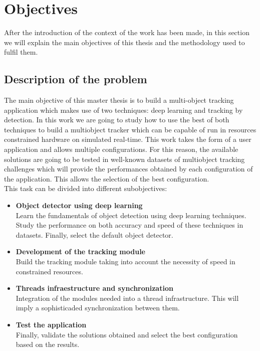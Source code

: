 \section{Objectives}
After the introduction of the context of the work has been made, in this section we will explain the main objectives of this thesis and the methodology used to fulfil them.

\subsection{Description of the problem}
The main objective of this master thesis is to build a multi-object tracking application which makes use of two techniques: deep learning and tracking by detection. In this work we are going to study how to use the best of both techniques to build a multiobject tracker which can be capable of run in resources constrained hardware on simulated real-time. This work takes the form of a user application and allows multiple configurations. For this reason, the available solutions are going to be tested in well-known datasets of multiobject tracking challenges which will provide the performances obtained by each configuration of the application. This allows the selection of the best configuration.\\
This task can be divided into different subobjectives:
\begin{itemize}
\item \textbf{Object detector using deep learning}\\
Learn the fundamentals of object detection using deep learning techniques. Study the performance on both accuracy and speed of these techniques in datasets. Finally, select the default object detector.
\item \textbf{Development of the tracking module}\\
Build the tracking module taking into account the necessity of speed in constrained resources.
\item \textbf{Threads infraestructure and synchronization}\\
Integration of the modules needed into a thread infrastructure. This will imply a sophisticaded synchronization between them.
\item \textbf{Test the application}\\
Finally, validate the solutions obtained and select the best configuration based on the results.
\end{itemize}

